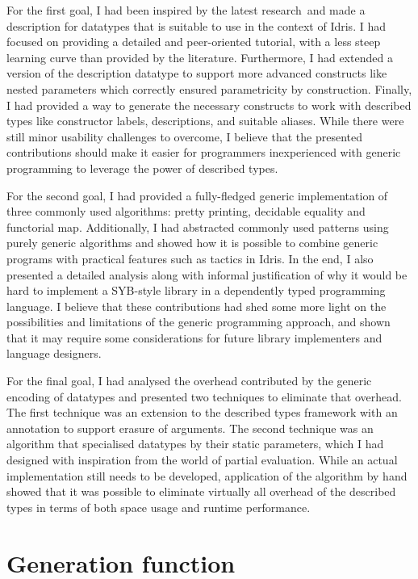 \documentclass{ituthesis}
\theoremstyle{break}
\begin{document}
For the first goal, I had been inspired by the latest research\,\autocite{Chapman:2010:GAL:1863543.1863547,Dagand2013acosmology,diehl2014eliminators} and made a description for datatypes that is suitable to use in the context of Idris.
I had focused on providing a detailed and peer-oriented tutorial, with a less steep learning curve than provided by the literature.
Furthermore, I had extended a version of the description datatype to support more advanced constructs like nested parameters which correctly ensured parametricity by construction.
Finally, I had provided a way to generate the necessary constructs to work with described types like constructor labels, descriptions, and suitable aliases.
While there were still minor usability challenges to overcome, I believe that the presented contributions should make it easier for programmers inexperienced with generic programming to leverage the power of described types.

For the second goal, I had provided a fully-fledged generic implementation of three commonly used algorithms: pretty printing, decidable equality and functorial map.
Additionally, I had abstracted commonly used patterns using purely generic algorithms and showed how it is possible to combine generic programs with practical features such as tactics in Idris.
In the end, I also presented a detailed analysis along with informal justification of why it would be hard to implement a SYB-style library in a dependently typed programming language.
I believe that these contributions had shed some more light on the possibilities and limitations of the generic programming approach, and shown that it may require some considerations for future library implementers and language designers.

For the final goal, I had analysed the overhead contributed by the generic encoding of datatypes and presented two techniques to eliminate that overhead.
The first technique was an extension to the described types framework with an annotation to support erasure of arguments.
The second technique was an algorithm that specialised datatypes by their static parameters, which I had designed with inspiration from the world of partial evaluation.
While an actual implementation still needs to be developed, application of the algorithm by hand showed that it was possible to eliminate virtually all overhead of the described types in terms of both space usage and runtime performance.

\printbibliography

\appendix
\chapter{Generation function}
\label{cha:Generation function}

\end{document}
